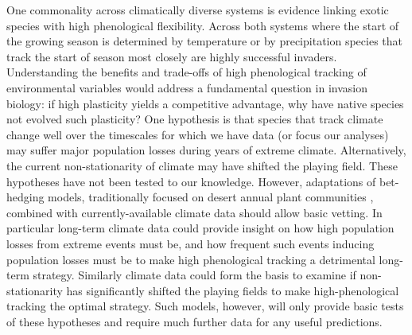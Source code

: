 \documentclass[11pt,a4paper,oneside]{article}
\begin{document}
One commonality across climatically diverse systems is evidence linking exotic species with high phenological flexibility. Across both systems where the start of the growing season is determined by temperature \citep{wolkovichAmBot2013} or by precipitation \citep{Wainwright:2012tw} species that track the start of season most closely are highly successful invaders. Understanding the benefits and trade-offs of high phenological tracking of environmental variables would address a fundamental question in invasion biology: if high plasticity yields a competitive advantage, why have native species not evolved such plasticity? One hypothesis is that species that track climate change well over the timescales for which we have data (or focus our analyses) may suffer major population losses during years of extreme climate. Alternatively, the current non-stationarity of climate may have shifted the playing field. These hypotheses have not been tested to our knowledge. However, adaptations of bet-hedging models, traditionally focused on desert annual plant communities \citep[e.g.,][]{donald2013}, combined with currently-available climate data should allow basic vetting. In particular long-term climate data could provide insight on how high population losses from extreme events must be, and how frequent such events inducing population losses must be to make high phenological tracking a detrimental long-term strategy. Similarly climate data could form the basis to examine if non-stationarity has significantly shifted the playing fields to make high-phenological tracking the optimal strategy. Such models, however, will only provide basic tests of these hypotheses and require much further data for any useful predictions.\\
\\
\end{document}
